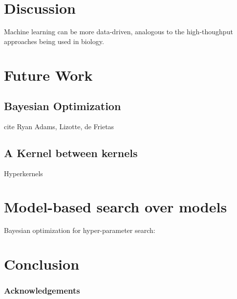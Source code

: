 \documentclass[twoside]{article}
\begin{document}
\section{Discussion}

Machine learning can be more data-driven, analogous to the high-thoughput approaches being used in biology. 

\section{Future Work}
\subsection{Bayesian Optimization}

cite Ryan Adams, Lizotte, de Frietas

\subsection{A Kernel between kernels}

Hyperkernels \cite{ong2002hyperkernels}
\section{Model-based search over models}

Bayesian optimization for hyper-parameter search: \cite{snoek2012practical}

\section{Conclusion}

\subsubsection*{Acknowledgements}




\end{document}
